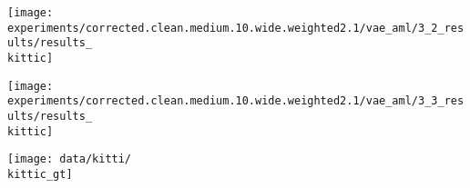 \begin{minipage}[t]{0.1\textwidth}
    \vspace{0px}\centering
    \texttt{[image: experiments/corrected.clean.medium.10.wide.weighted2.1/vae\_aml/3\_2\_results/results\_\\kittic]}
\end{minipage}
\begin{minipage}[t]{0.1\textwidth}
    \vspace{0px}\centering
    \texttt{[image: experiments/corrected.clean.medium.10.wide.weighted2.1/vae\_aml/3\_3\_results/results\_\\kittic]}
\end{minipage}
\begin{minipage}[t]{0.1\textwidth}
    \vspace{0px}\centering
    \texttt{[image: data/kitti/\\kittic\_gt]}
\end{minipage}